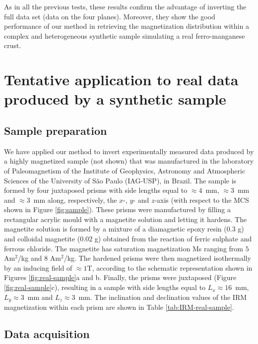 \documentclass[draft,gc]{agutex}
\begin{document}
\begin{article}
As in all the previous tests, these results confirm the 
advantage of inverting the full data set (data on the four planes).
Moreover, they show the good performance of our method
in retrieving the magnetization distribution within a complex and
heterogeneous synthetic sample simulating a real ferro-manganese
crust.

\section{Tentative application to real data produced by a synthetic sample}
\label{sec:Tentative application to real data produced by a synthetic sample}

\subsection{Sample preparation}
\label{subsec:Sample preparation}

We have applied our method to invert experimentally measured
data produced by a highly magnetized sample (not shown) 
that was manufactured in the laboratory of Paleomagnetism of the
Institute of Geophysics, Astronomy and Atmospheric Sciences of the
University of S\~{a}o Paulo (IAG-USP), in Brazil.
The sample is formed by four juxtaposed prisms with side lengths
equal to $\approx 4$~mm, $\approx 3$~mm and $\approx 3$~mm along, 
respectively, the $x$-,
$y$- and $z$-axis (with respect to the MCS shown in Figure 
\ref{fig:sample}).
These prisms were manufactured by filling a rectangular 
acrylic mould with a magnetite solution and letting it hardens.
The magnetite solution is formed by a mixture of a diamagnetic 
epoxy resin ($0.3$ g) and colloidal magnetite ($0.02$ g) obtained 
from the reaction of ferric sulphate and ferrous chloride.
The magnetite has saturation magnetization Ms ranging from 
$5$ Am$^{2}$/kg and $8$ Am$^{2}$/kg.
The hardened prisms were then magnetized isothermally
by an inducing field of $\approx 1$T, according to the
schematic representation shown in Figures 
\ref{fig:real-sample}a and b.
Finally, the prisms were juxtaposed (Figure \ref{fig:real-sample}c),
resulting in a sample with side lengths equal to
$L_{x} \approx 16$~mm, $L_{y} \approx 3$~mm and 
$L_{z} \approx 3$~mm. The inclination and declination values 
of the IRM magnetization within each prism
are shown in Table \ref{tab:IRM-real-sample}.

\subsection{Data acquisition}
\label{subsec:Data acquisition and pre-processing}


\end{article}
\end{document}
